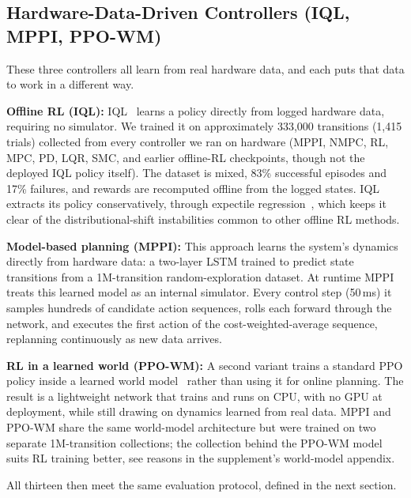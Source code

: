 \subsection{Hardware-Data-Driven Controllers (IQL, MPPI, PPO-WM)}

These three controllers all learn from real hardware data, and each puts that data to work in a different way.

\noindent\textbf{Offline RL (IQL):} IQL~\cite{kostrikov2022iql} learns a policy directly from logged hardware data, requiring no simulator.
We trained it on approximately 333,000 transitions (1,415 trials) collected from every controller we ran on hardware (MPPI, NMPC, RL, MPC, PD, LQR, SMC, and earlier offline-RL checkpoints, though not the deployed IQL policy itself).
The dataset is mixed, 83\% successful episodes and 17\% failures, and rewards are recomputed offline from the logged states.
IQL extracts its policy conservatively, through expectile regression~\cite{kostrikov2022iql}, which keeps it clear of the distributional-shift instabilities common to other offline RL methods.

\noindent\textbf{Model-based planning (MPPI):} This approach learns the system's dynamics directly from hardware data: a two-layer LSTM trained to predict state transitions from a 1M-transition random-exploration dataset.
At runtime MPPI treats this learned model as an internal simulator.
Every control step (50\,ms) it samples hundreds of candidate action sequences, rolls each forward through the network, and executes the first action of the cost-weighted-average sequence, replanning continuously as new data arrives.

\noindent\textbf{RL in a learned world (PPO-WM):} A second variant trains a standard PPO policy inside a learned world model~\cite{hafner2020dream} rather than using it for online planning.
The result is a lightweight network that trains and runs on CPU, with no GPU at deployment, while still drawing on dynamics learned from real data.
MPPI and PPO-WM share the same world-model architecture but were trained on two separate 1M-transition collections; the collection behind the PPO-WM model suits RL training better, see reasons in the supplement's world-model appendix.

All thirteen then meet the same evaluation protocol, defined in the next section.
